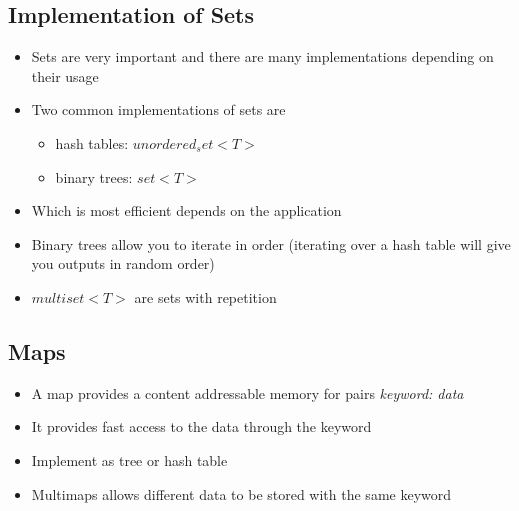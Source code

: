 
\begin{slide}
\section[-1]{Implementation of Sets}

\begin{PauseHighLight}
  \begin{itemize}
  \item Sets are very important and there are many implementations
    depending on their usage\pause
  \item Two common implementations of sets are
    \begin{itemize}
    \item hash tables: \jl$unordered_set<T>$
    \item binary trees: \jl$set<T>$ \pause
    \end{itemize}
  \item Which is most efficient depends on the application\pause
  \item Binary trees allow you to iterate in order\pause{} (iterating
    over a hash table will give you outputs in random order)\pauseb
  \item \jl$multiset<T>$ are sets with repetition\pause
  \end{itemize}
\end{PauseHighLight}
\end{slide}




\begin{slide}
\section{Maps}

\begin{PauseHighLight}
  \begin{itemize}
  \item A map provides a content addressable memory for pairs
  \textit{keyword: data}\pause
  \item It provides fast access to the data through the keyword\pause
  \item Implement as tree or hash table\pause
  \item Multimaps allows different data to be stored with the same
    keyword\pause
  \end{itemize}
\end{PauseHighLight}
\end{slide}




